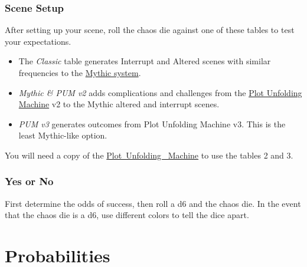 

\subsection{Scene Setup}
After setting up your scene, roll the chaos die against one of these tables to
test your expectations.
\begin{itemize}
\item The \emph{Classic} table generates Interrupt and Altered scenes with similar
frequencies to the \href{https://www.wordmillgames.com/mythic-gme.html}{Mythic
system}.
\item \emph{Mythic \& PUM v2} adds complications and challenges from the
\href{https://jeansenvaars.itch.io/plot-unfolding-machine}{Plot Unfolding
Machine} v2 to the Mythic altered and interrupt scenes.
\item \emph{PUM v3} generates outcomes from Plot Unfolding Machine v3. This is
the least Mythic-like option.
\end{itemize}
\begin{DndComment}{}
You will need a copy of the
\href{https://jeansenvaars.itch.io/plot-unfolding-machine}{Plot~Unfolding~
Machine} to use the tables 2 and 3.
\end{DndComment}





\subsection{Yes or No}
First determine the odds of success, then roll a d6 and the chaos die. In the
event that the chaos die is a d6, use different colors to tell the dice apart.

\appendix

\chapter{Probabilities}

